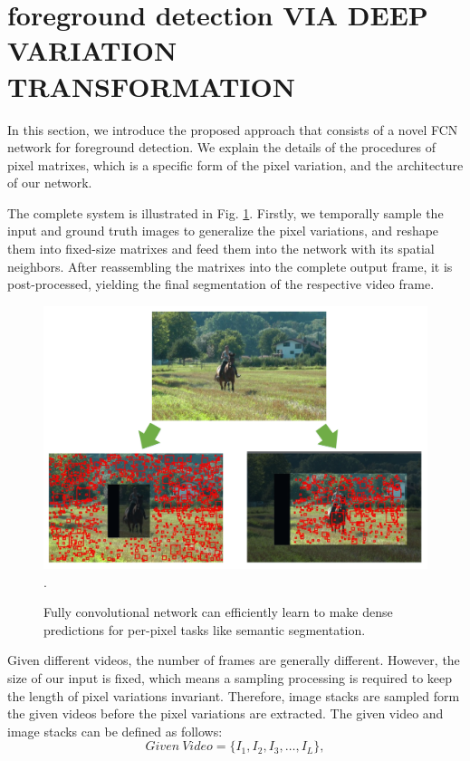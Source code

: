 \documentclass[journal]{IEEEtran}
\newcommand{\reffig}[1]{Fig. \ref{#1}}
\begin{document}

\section{foreground detection VIA DEEP VARIATION TRANSFORMATION}
\label{sec4}
In this section, we introduce the proposed approach that consists of a novel FCN network for foreground detection. 
We explain the details of the procedures of pixel matrixes, which is a specific form of the pixel variation, and the architecture of our network. 


The complete system is illustrated in \reffig{flow_chart}. 
Firstly, we temporally sample the input and ground truth images to generalize the pixel variations, and reshape them into fixed-size matrixes and feed them into the network with its spatial neighbors. 
After reassembling the matrixes into the complete output frame, it is post-processed, yielding the final segmentation of the respective video frame.
\begin{figure}[!t] %
\centering
\includegraphics[width=\textwidth]{figure/fig2}
\DeclareGraphicsExtensions.
    \caption{Fully convolutional network can efficiently learn to make dense predictions for per-pixel tasks like semantic segmentation.}
    \label{flow_chart}
\end{figure}


Given different videos, the number of frames are generally different. 
However, the size of our input is fixed, which means a sampling processing is required to keep the length of pixel variations invariant. 
Therefore, image stacks are sampled form the given videos before the pixel variations are extracted. 
The given video and image stacks can be defined as follows: 
\begin{equation}
	Given \  Video=\{ I_1,I_2,I_3,\dots,I_L\} ,
\end{equation}
\end{document}
